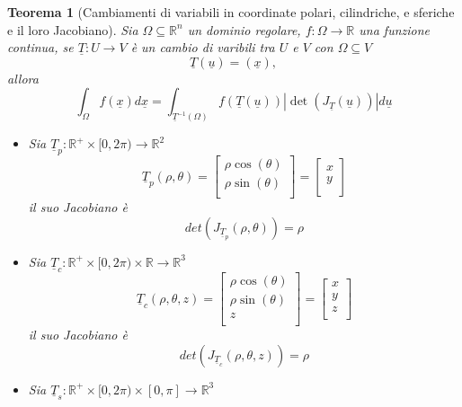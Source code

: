 \documentclass[12pt, a4paper]{article}
\theoremstyle{break}
\newtheorem{theorem}{Teorema} %
\begin{document}
\newpage
\begin{theorem} [Cambiamenti di variabili in coordinate polari, cilindriche, e
		sferiche e il loro Jacobiano]
	Sia $\Omega \subseteq \mathbb{R}^n$ un dominio regolare, $f: \Omega
		\to \mathbb{R}$ una funzione continua, se $\underline{T} : U \to
		V$ è un cambio di varibili tra $U$ e $V$ con $\Omega \subseteq V$
	\[
		\underline{T}(\underline{u}) = (\underline{x}),
	\]
	allora
	\[
		\int_{\Omega} f(\underline{x}) d \underline{x}
		= \int_{\underline{T}^{-1}(\Omega)} f(\underline{T}(\underline{u}))
		| \det(J_{\underline{T}}(\underline{u})) | d \underline{u}
	\]
	\begin{itemize}
		\item Sia $\underline{T}_p : \mathbb{R}^+ \times [0,2\pi) \to
			      \mathbb{R}^2$
		      \[
			      \underline{T}_p(\rho, \theta) =
			      \begin{bmatrix}
				      \rho \cos(\theta) \\
				      \rho \sin(\theta) \\
			      \end{bmatrix}
			      =
			      \begin{bmatrix}
				      x \\
				      y \\
			      \end{bmatrix}
		      \]
		      il suo Jacobiano è
		      \[
			      det(J_{\underline{T}_p} (\rho, \theta)) = \rho
		      \]
		\item Sia $\underline{T}_c : \mathbb{R}^+ \times
			      [0,2\pi) \times \mathbb{R} \to \mathbb{R}^3$
		      \[
			      \underline{T}_c (\rho, \theta, z) =
			      \begin{bmatrix}
				      \rho \cos(\theta) \\
				      \rho \sin(\theta) \\
				      z                 \\
			      \end{bmatrix}
			      =
			      \begin{bmatrix}
				      x \\
				      y \\
				      z \\
			      \end{bmatrix}
		      \]
		      il suo Jacobiano è
		      \[
			      det(J_{\underline{T}_c} (\rho, \theta, z)) = \rho
		      \]
		\item Sia $\underline{T}_s : \mathbb{R}^+ \times
			      [0,2\pi) \times [0,\pi] \to \mathbb{R}^3$
		      \[
\]
\end{itemize}
\end{theorem}
\end{document}
